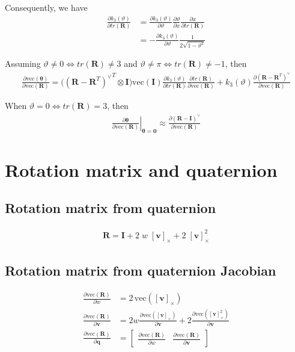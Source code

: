 \documentclass{article}
\renewcommand\aa{\bm{\theta}}
\renewcommand\t{\vartheta}
\newcommand\R{\bm{R}}
\newcommand\q{\bm{q}}
\newcommand\I{\bm{I}}
\renewcommand\v{\bm{v}}
\renewcommand\skew[1]{[#1]_{\times}}
\newcommand\vecop[1]{\text{vec} \left( #1\right)}
\begin{document}
Consequently, we have
\begin{align}
  \frac{\partial k_3(\t)}{\partial tr(\R)} 
  &=\frac{\partial k_3(\t)}{\partial \t} 
    \frac{\partial \t}{\partial x} 
    \frac{\partial x}{\partial tr(\R)} \\
  &=-\frac{\partial k_3(\t)}{\partial \t} 
    \frac{1}{2\sqrt{1-\t^2}}
\end{align}

Assuming $\t \neq 0 \iff tr(\R) \neq 3$ and $\t \neq \pi \iff tr(\R) \neq -1$, then
\begin{align}
  \frac{\partial \vecop{\aa}}{\partial \vecop{\R}} = 
    \big({(\R - \R^T)^\vee}^T \otimes \I \big)
    \vecop{\I}
    \frac{\partial k_3(\t)}{\partial tr(\R)} 
    \frac{\partial tr(\R)}{\partial \vecop{\R}} + 
    k_3(\t) \frac{\partial \left( \R - \R^T \right)^\vee}{\partial \vecop{\R}}
\end{align}

When $\t = 0 \iff tr(\R) = 3$, then 
\begin{align}
  \left. \frac{\partial \aa}{\partial \vecop{\R}} \right \vert_{\aa = \bm{0}} \approx
    \frac{\partial \left(\R - \I \right)^\vee}{\partial \vecop{\R}}
\end{align}

\section{Rotation matrix and quaternion}
\subsection{Rotation matrix from quaternion}
\begin{align}
  \R = \I + 2 \; w \; \skew{\v} + 2\; \skew{\v}^2
\end{align}

\subsection{Rotation matrix from quaternion Jacobian}
\begin{align}
  \frac{\partial \vecop{\R}}{\partial w} &= 2\, \vecop{\skew{\v}} \\
  \frac{\partial \vecop{\R}}{\partial \v} &= 
  2w \frac{\partial\vecop{\skew{\v}}}{\partial \v} +
  2 \frac{\partial\vecop{\skew{\v}^2}}{\partial \v} \\
  \frac{\partial \vecop{\R}}{\partial \q} &= 
    \begin{bmatrix}
      \frac{\partial \vecop{\R}}{\partial w} & 
      \frac{\partial \vecop{\R}}{\partial \v}
    \end{bmatrix}
\end{align}
\end{document}
